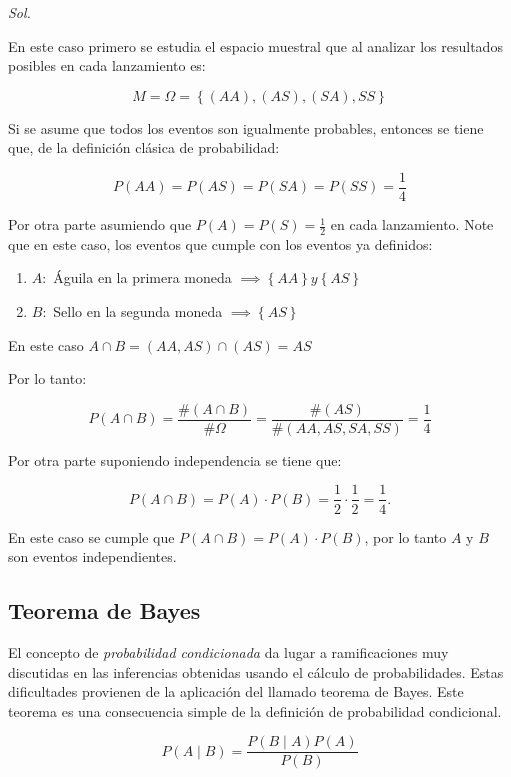 \textit{ Sol. }

En este caso primero se estudia el espacio muestral que al analizar los resultados posibles en cada lanzamiento es:

\begin{equation*}
    M = \Omega  = \left\{(AA),(AS),(SA),SS\right\}
\end{equation*}

Si se asume que todos los eventos son igualmente probables, entonces se tiene
que, de la definición clásica de probabilidad:

\begin{equation*}
    P(AA)=P(AS)=P(SA)=P(SS)=\frac{1}{4}
\end{equation*}

Por otra parte asumiendo que $P(A)=P(S)=\frac{1}{2}$ en cada lanzamiento.
Note que en este caso, los eventos que cumple con los eventos ya definidos:

\begin{enumerate}
    \item $A:$ Águila en la primera moneda $\implies  \left\{AA\right\} y \left\{AS\right\}$
    \item $B:$ Sello en la segunda moneda  $\implies  \left\{AS\right\}$
\end{enumerate}

En este caso $A \cap B =( {AA}, {AS} )\cap( {AS} )={AS}$

Por lo tanto:

\begin{equation*}
    P( A\cap B)=\frac{\# ( A\cap B)}{\#\Omega}=\frac{\#( AS)}{\#( AA , AS ,SA , SS)} = \frac{1}{4}
\end{equation*}

Por otra parte suponiendo independencia se tiene que:

\begin{equation*}
    P(A\cap B)=P(A)\cdot P(B)=\frac{1}{2}\cdot \frac{1}{2}=\frac{1}{4}.
\end{equation*}

En este caso se cumple que $P(A \cap B)=P(A)\cdot P(B)$, por lo
tanto $A$ y $B$ son eventos independientes.


\subsection{Teorema de Bayes}

El concepto de \textit{probabilidad condicionada} da lugar a
ramificaciones muy discutidas en las inferencias obtenidas
usando el cálculo de probabilidades.
Estas dificultades provienen de la aplicación del llamado
teorema de Bayes. Este teorema es una consecuencia simple de la definición
de probabilidad condicional.
\newpage
\begin{theorem}[Bayes]
    \begin{equation}
        P(A\mid B)=\frac{P(B\mid A)P(A)}{P(B)}
        \label{eqBayes}
    \end{equation}
\end{theorem}

